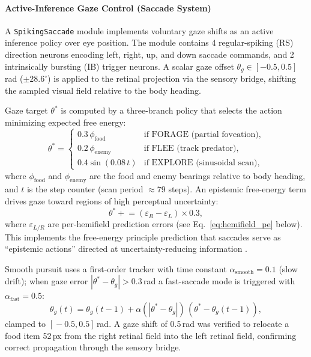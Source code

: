 \documentclass[12pt]{article}
\begin{document}
\paragraph{Active-Inference Gaze Control (Saccade System)}

A \texttt{SpikingSaccade} module implements voluntary gaze shifts
as an active inference policy over eye position.
The module contains 4 regular-spiking (RS) direction neurons encoding
left, right, up, and down saccade commands, and 2 intrinsically bursting
(IB) trigger neurons.
A scalar gaze offset $\theta_g \in [-0.5, 0.5]$\,rad ($\pm 28.6^\circ$)
is applied to the retinal projection via the sensory bridge, shifting
the sampled visual field relative to the body heading.

Gaze target $\theta^*$ is computed by a three-branch policy that selects
the action minimizing expected free energy:
\begin{equation}\label{eq:gaze_policy}
  \theta^* = \begin{cases}
    0.3\,\phi_\text{food}   & \text{if FORAGE (partial foveation)}, \\
    0.2\,\phi_\text{enemy}  & \text{if FLEE (track predator)}, \\
    0.4\sin(0.08\,t)        & \text{if EXPLORE (sinusoidal scan)},
  \end{cases}
\end{equation}
where $\phi_\text{food}$ and $\phi_\text{enemy}$ are the food and
enemy bearings relative to body heading, and $t$ is the step counter
(scan period $\approx 79$ steps).
An epistemic free-energy term drives gaze toward regions of high
perceptual uncertainty:
\begin{equation}\label{eq:gaze_fe}
  \theta^* \mathrel{+}= (\varepsilon_R - \varepsilon_L) \times 0.3,
\end{equation}
where $\varepsilon_{L/R}$ are per-hemifield prediction errors
(see Eq.~\ref{eq:hemifield_pe} below).
This implements the free-energy principle prediction that saccades
serve as ``epistemic actions'' directed at uncertainty-reducing
information \citep{friston2012}.

Smooth pursuit uses a first-order tracker with time constant
$\alpha_\text{smooth} = 0.1$ (slow drift); when gaze error
$|\theta^* - \theta_g| > 0.3$\,rad a fast-saccade mode is triggered
with $\alpha_\text{fast} = 0.5$:
\begin{equation}\label{eq:gaze_track}
  \theta_g(t) = \theta_g(t{-}1)
    + \alpha(|\theta^* - \theta_g|)\,(\theta^* - \theta_g(t{-}1)),
\end{equation}
clamped to $[\!-0.5, 0.5]$\,rad.
A gaze shift of 0.5\,rad was verified to relocate a food item 52\,px
from the right retinal field into the left retinal field, confirming
correct propagation through the sensory bridge.
\end{document}
